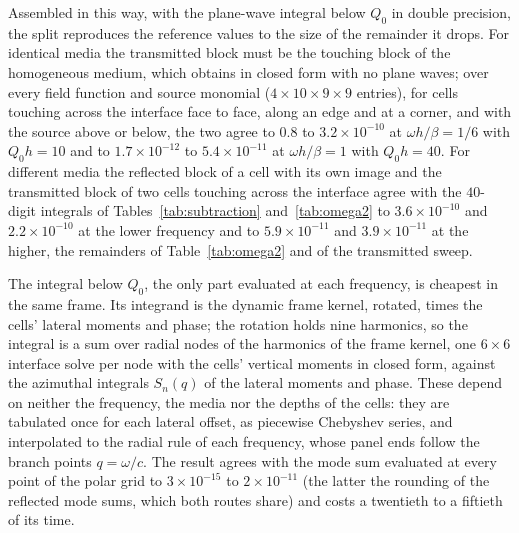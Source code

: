 \documentclass[11pt,a4paper]{article}
\begin{document}
Assembled in this way, with the plane-wave integral below $Q_0$ in double precision, the split reproduces the reference values to the size of the remainder it drops. For
identical media the transmitted block must be the touching block of the homogeneous medium, which
\citet{NestorCoupling2026} obtains in closed form with no plane waves; over every field function and source
monomial ($4\times10\times9\times9$ entries), for cells touching across the interface face to face, along an
edge and at a corner, and with the source above or below, the two agree to $0.8$ to $3.2\times10^{-10}$ at
$\omega h/\beta=1/6$ with $Q_0h=10$ and to $1.7\times10^{-12}$ to $5.4\times10^{-11}$ at $\omega h/\beta=1$ with
$Q_0h=40$. For different media the reflected block of a cell with its own image and the transmitted block of
two cells touching across the interface agree with the $40$-digit integrals of Tables~\ref{tab:subtraction}
and~\ref{tab:omega2} to $3.6\times10^{-10}$ and $2.2\times10^{-10}$ at the lower frequency and to
$5.9\times10^{-11}$ and $3.9\times10^{-11}$ at the higher, the remainders of Table~\ref{tab:omega2} and of
the transmitted sweep.

The integral below $Q_0$, the only part evaluated at each frequency, is cheapest in the same frame. Its
integrand is the dynamic frame kernel, rotated, times the cells' lateral moments and phase; the rotation holds
nine harmonics, so the integral is a sum over radial nodes of the harmonics of the frame kernel, one $6\times6$
interface solve per node with the cells' vertical moments in closed form, against the azimuthal integrals
$S_n(q)$ of the lateral moments and phase. These depend on neither the frequency, the media nor the depths of
the cells: they are tabulated once for each lateral offset, as piecewise Chebyshev series, and interpolated
to the radial rule of each frequency, whose panel ends follow the branch points $q=\omega/c$. The result agrees
with the mode sum evaluated at every point of the polar grid to $3\times10^{-15}$ to $2\times10^{-11}$ (the
latter the rounding of the reflected mode sums, which both routes share) and costs a twentieth to a fiftieth
of its time.
\end{document}
